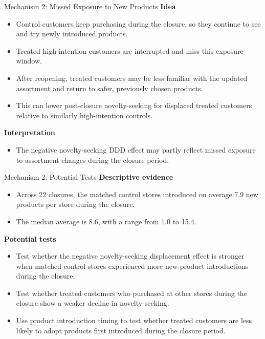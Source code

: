 \documentclass[aspectratio=169]{beamer}  %
\begin{document}
\begin{frame}{Mechanism 2: Missed Exposure to New Products}
\footnotesize
\textbf{Idea}
\begin{itemize}
    \item Control customers keep purchasing during the closure, so they continue to see and try newly introduced products.
    \item Treated high-intention customers are interrupted and miss this exposure window.
    \item After reopening, treated customers may be less familiar with the updated assortment and return to safer, previously chosen products.
    \item This can lower post-closure novelty-seeking for displaced treated customers relative to similarly high-intention controls.
\end{itemize}

\textbf{Interpretation}
\begin{itemize}
    \item The negative novelty-seeking DDD effect may partly reflect missed exposure to assortment changes during the closure period.
\end{itemize}
\end{frame}

\begin{frame}{Mechanism 2: Potential Tests}
\footnotesize
\textbf{Descriptive evidence}
\begin{itemize}
    \item Across 22 closures, the matched control stores introduced on average 7.9 new products per store during the closure.
    \item The median average is 8.6, with a range from 1.0 to 15.4.
\end{itemize}

\textbf{Potential tests}
\begin{itemize}
    \item Test whether the negative novelty-seeking displacement effect is stronger when matched control stores experienced more new-product introductions during the closure.
    \item Test whether treated customers who purchased at other stores during the closure show a weaker decline in novelty-seeking.
    \item Use product introduction timing to test whether treated customers are less likely to adopt products first introduced during the closure period.
\end{itemize}
\end{frame}
\end{document}
